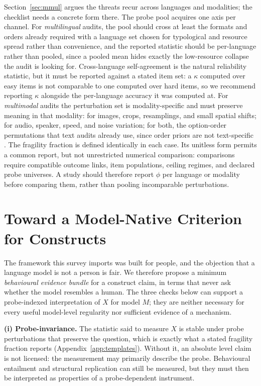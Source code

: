 \documentclass[11pt]{article}
\begin{document}
Section~\ref{sec:mmul} argues the threats recur across languages and modalities;
the checklist needs a concrete form there. The probe pool acquires one axis per
channel. For \emph{multilingual} audits, the pool should cross at least the
formats and orders already required with a language set chosen for typological
and resource spread rather than convenience, and the reported statistic should be
per-language rather than pooled, since a pooled mean hides exactly the
low-resource collapse the audit is looking for. Cross-language self-agreement is
the natural reliability statistic, but it must be reported against a stated
item set: a $\kappa$ computed over easy items is not comparable to one computed
over hard items, so we recommend reporting $\kappa$ alongside the per-language
accuracy it was computed at. For \emph{multimodal} audits the perturbation set is
modality-specific and must preserve meaning in that modality: for images,
crops, resamplings, and small spatial shifts; for audio, speaker, speed, and
noise variation; for both, the option-order permutations that text audits already
use, since order priors are not text-specific
\cite{atabuzzaman2025mcqa,lin2025hearing,rosenfeld2025questioning}. The
fragility fraction is defined identically in each case. Its unitless form permits
a common report, but not unrestricted numerical comparison: comparisons require
compatible outcome links, item populations, ceiling regimes, and declared probe
universes. A study should therefore report $\phi$ per language or modality before
comparing them, rather than pooling incomparable perturbations.

\section{Toward a Model-Native Criterion for Constructs}
\label{app:construct}

The framework this survey imports was built for people, and the objection that a
language model is not a person is fair. We therefore propose a minimum
\emph{behavioural evidence bundle} for a construct claim, in terms that never
ask whether the model resembles a human. The three checks below can support a
probe-indexed interpretation of $X$ for model $M$; they are neither necessary
for every useful model-level regularity nor sufficient evidence of a mechanism.

\textbf{(i) Probe-invariance.} The statistic said to measure $X$ is stable under
probe perturbations that preserve the question, which is exactly what a stated
fragility fraction reports (Appendix~\ref{app:templates}). Without it, an
absolute level claim is not licensed: the measurement may primarily describe the
probe. Behavioural entailment and structural replication can still be measured,
but they must then be interpreted as properties of a probe-dependent instrument.
\end{document}
